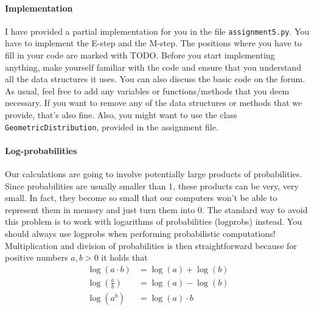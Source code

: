 \documentclass[11pt, a4paper]{article}
\begin{document}
\paragraph{Implementation}

I have provided a partial implementation for you in the file \texttt{assignment5.py}. 
You have to implement the E-step and the M-step. The positions where you have to fill in your code are marked with TODO. Before you start implementing anything,
make yourself familiar with the code and ensure that you understand all the data structures it uses. You can also discuss the basic code on the forum. As usual, feel
free to add any variables or functions/methods that you deem necessary. If you want to remove any of the data structures or methods that we provide, that's also fine.
Also, you might want to use the class \texttt{GeometricDistribution}, provided in the assignment file.


\paragraph{Log-probabilities}

Our calculations are going to involve potentially large products of probabilities. Since
probabilities are usually smaller than 1, these products can be very, very small. In fact, they become so small that our computers won't be able to 
represent them in memory and just turn them into 0.
The standard way to avoid this problem is to work with logarithms of probabilities (logprobs) instead. You should always use logprobs when performing
probabilistic computations! Multiplication and division of probabilities is then straightforward because for positive numbers $ a,b > 0 $ it holds that
\begin{align*}
\log(a \cdot b) &= \log(a) + \log(b) \\
\log\left( \frac{a}{b} \right) &= \log(a) - \log(b) \\
\log\left( a^{b} \right) &= \log(a) \cdot b
\end{align*}
\end{document}
